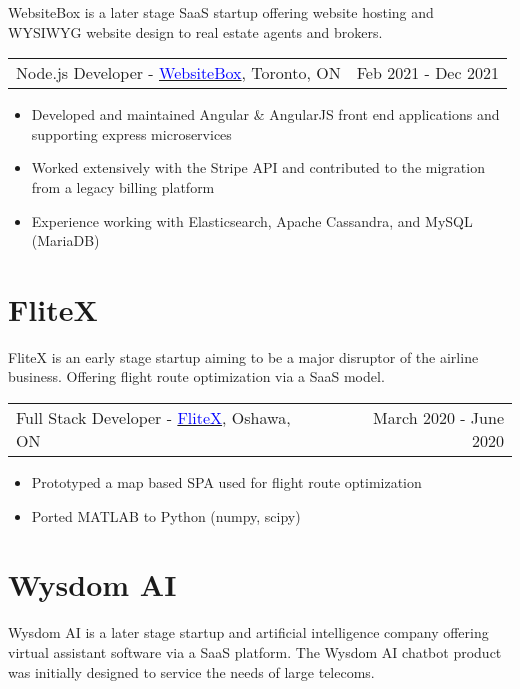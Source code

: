 \documentclass[margin]{res}
\begin{document}
\begin{resume}
	WebsiteBox is a later stage SaaS startup offering website hosting and WYSIWYG
	website design to real estate agents and brokers.

	\begin{tabular}{p{3in} r} %
		Node.js Developer - \href{https://websitebox.com}{\textcolor{blue}{WebsiteBox}}, Toronto, ON & Feb 2021 - Dec 2021
	\end{tabular}

	\begin{itemize} %
		\item Developed and maintained Angular \& AngularJS front end applications and supporting
		      express microservices
		\item Worked extensively with the Stripe API and contributed to the migration from a legacy
		      billing platform
		\item Experience working with Elasticsearch, Apache Cassandra, and MySQL (MariaDB)
	\end{itemize}

	\normalsize{\section{FliteX}}

	FliteX is an early stage startup aiming to be a major disruptor of the airline business.
	Offering flight route optimization via a SaaS model.

	\begin{tabular}{p{3in} r} %
		Full Stack Developer - \href{https://flitex.net/}{\textcolor{blue}{FliteX}}, Oshawa, ON & March 2020 - June 2020
	\end{tabular}
	\begin{itemize} %
		\item Prototyped a map based SPA used for flight route optimization
		\item Ported MATLAB to Python (numpy, scipy)
	\end{itemize}

	\normalsize{\section{Wysdom AI}}

	Wysdom AI is a later stage startup and artificial intelligence company offering virtual assistant software
	via a SaaS platform. The Wysdom AI chatbot product was initially designed to service the needs of
	large telecoms.


\end{resume}
\end{document}
